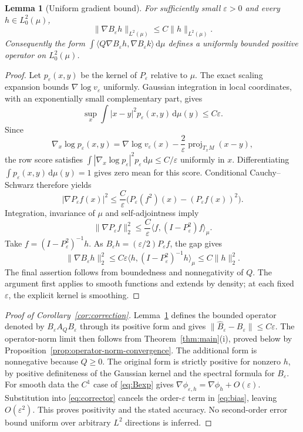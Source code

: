\documentclass[11pt,a4paper]{article}
\newtheorem{lemma}[theorem]{Lemma}
\theoremstyle{definition}\newtheorem{definition}[theorem]{Definition}
\theoremstyle{remark}\newtheorem{remark}[theorem]{Remark}
\newcommand{\eps}{\varepsilon}
\newcommand{\dd}{\,\mathrm d}
\newcommand{\ip}[2]{\langle #1,#2\rangle_\mu}
\newcommand{\norm}[1]{\lVert #1\rVert}
\begin{document}
\begin{lemma}[Uniform gradient bound]\label{lem:gradient}
For sufficiently small $\eps>0$ and every $h\in L^2_0(\mu)$,
\begin{equation}\label{eq:gradientB}
\norm{\nabla B_\eps h}_{L^2(\mu)}\leq C\norm{h}_{L^2(\mu)}.
\end{equation}
Consequently the form $\int\langle Q\nabla B_\eps h,\nabla B_\eps k\rangle\dd\mu$ defines a uniformly bounded positive operator on $L^2_0(\mu)$.
\end{lemma}
\begin{proof}
Let $p_\eps(x,y)$ be the kernel of $P_\eps$ relative to $\mu$. The exact scaling expansion bounds $\nabla\log v_\eps$ uniformly. Gaussian integration in local coordinates, with an exponentially small complementary part, gives
\[
\sup_x\int|x-y|^2p_\eps(x,y)\dd\mu(y)\leq C\eps.
\]
Since
\[
\nabla_x\log p_\eps(x,y)=\nabla\log v_\eps(x)
-\frac2\eps\operatorname{proj}_{T_xM}(x-y),
\]
the row score satisfies $\int|\nabla_x\log p_\eps|^2p_\eps\dd\mu\leq C/\eps$ uniformly in $x$. Differentiating $\int p_\eps(x,y)\dd\mu(y)=1$ gives zero mean for this score. Conditional Cauchy--Schwarz therefore yields
\[
|\nabla P_\eps f(x)|^2
\leq\frac C\eps\bigl(P_\eps(f^2)(x)-(P_\eps f(x))^2\bigr).
\]
Integration, invariance of $\mu$ and self-adjointness imply
\[
\norm{\nabla P_\eps f}_2^2
\leq\frac C\eps\ip{f}{(I-P_\eps^2)f}.
\]
Take $f=(I-P_\eps^2)^{-1}h$. As $B_\eps h=(\eps/2)P_\eps f$, the gap gives
\[
\norm{\nabla B_\eps h}_2^2
\leq C\eps\ip{h}{(I-P_\eps^2)^{-1}h}
\leq C\norm h_2^2.
\]
The final assertion follows from boundedness and nonnegativity of $Q$. The argument first applies to smooth functions and extends by density; at each fixed $\eps$, the explicit kernel is smoothing.
\end{proof}

\begin{proof}[Proof of Corollary~\ref{cor:correction}]
Lemma~\ref{lem:gradient} defines the bounded operator denoted by $B_\eps A_QB_\eps$ through its positive form and gives $\norm{\widehat B_\eps-B_\eps}\leq C\eps$. The operator-norm limit then follows from Theorem~\ref{thm:main}(i), proved below by Proposition~\ref{prop:operator-norm-convergence}. The additional form is nonnegative because $Q\geq0$. The original form is strictly positive for nonzero $h$, by positive definiteness of the Gaussian kernel and the spectral formula for $B_\eps$. For smooth data the $C^1$ case of \eqref{eq:Bexp} gives
$\nabla\phi_{\eps,h}=\nabla\phi_h+O(\eps)$.
Substitution into \eqref{eq:corrector} cancels the order-$\eps$ term in \eqref{eq:bias}, leaving $O(\eps^2)$. This proves positivity and the stated accuracy. No second-order error bound uniform over arbitrary $L^2$ directions is inferred.
\end{proof}
\end{document}
